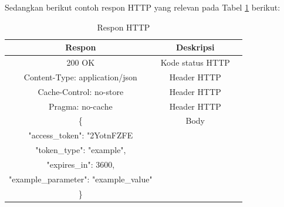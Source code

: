 Sedangkan berikut contoh respon HTTP yang relevan pada Tabel \ref{tab:res_http} berikut:

\begin{table}[h]
    \caption{Respon HTTP}
    \vspace{0.5em}
    \centering
    \begin{tabular}{|c|c|c|}
        \hline
        Respon & Deskripsi \\
        \hline \hline
        200 OK & Kode status HTTP \\
        \hline
        Content-Type: application/json & Header HTTP \\
        \hline
        Cache-Control: no-store & Header HTTP \\
        \hline
        Pragma: no-cache & Header HTTP \\
        \hline
        \{ & Body \\
        \hline
        "access\_token": "2YotnFZFE & \\
        \hline
        "token\_type": "example", & \\
        \hline
        "expires\_in": 3600, & \\
        \hline
        "example\_parameter": "example\_value" & \\
        \hline
        \} & \\
        \hline
    \end{tabular}
    \label{tab:res_http}
\end{table}


